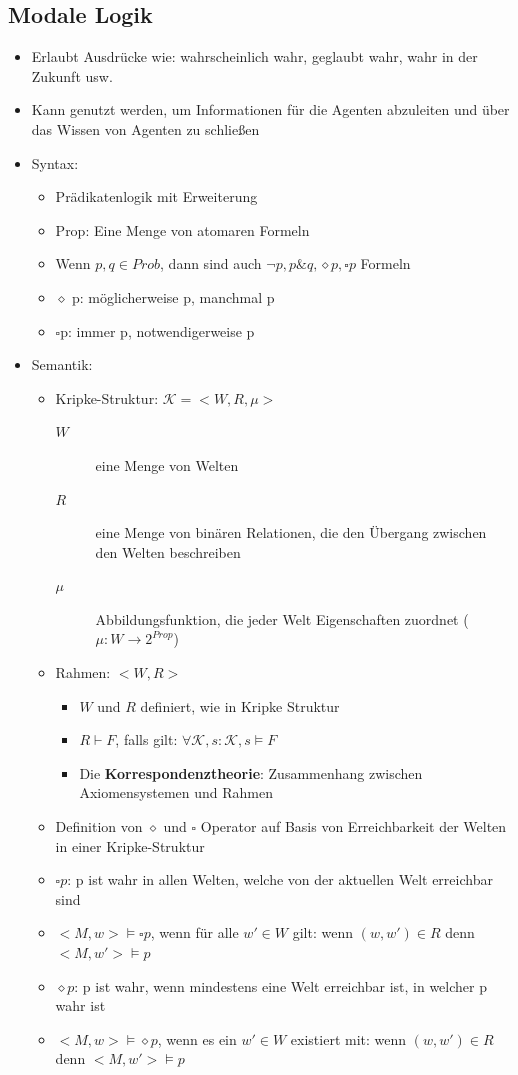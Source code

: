 \documentclass{article} %
\begin{document}
	\subsection{Modale Logik}
	\begin{itemize}
		\item Erlaubt Ausdrücke wie: wahrscheinlich wahr, geglaubt wahr, wahr in der Zukunft usw.
		\item Kann genutzt werden, um Informationen für die Agenten abzuleiten und über das Wissen von Agenten zu schließen
		\item Syntax:
		\begin{itemize}
			\item Prädikatenlogik mit Erweiterung
			\item Prop: Eine Menge von atomaren Formeln
			\item Wenn $p,q \in Prob$, dann sind auch $\neg p, p \& q, \diamond p,\square p$ Formeln
			\item $\diamond$ p: möglicherweise p, manchmal p 
			\item $\square$p: immer p, notwendigerweise p
		\end{itemize}
		\item Semantik:
		\begin{itemize}
			\item Kripke-Struktur: $\mathcal{K} = <W,R,\mu>$
			\begin{description}
				\item[$W$] eine Menge von Welten
				\item[$R$] eine Menge von binären Relationen, die den Übergang zwischen den Welten  beschreiben
				\item[$\mu$] Abbildungsfunktion, die jeder Welt Eigenschaften zuordnet ($\mu : W \rightarrow 2^{Prop}$)	
			\end{description}
				\item Rahmen: $<W,R>$
				\begin{itemize}
					\item  $W$ und $R$ definiert, wie in Kripke Struktur
					\item $R \vdash F$, falls gilt: $\forall \mathcal{K},s: \mathcal{K},s \vDash F$ 
					\item Die \textbf{Korrespondenztheorie}: Zusammenhang zwischen Axiomensystemen und Rahmen					
				\end{itemize}
			\item Definition von $\diamond$ und $\square$ Operator auf Basis von Erreichbarkeit der Welten in einer Kripke-Struktur
			\item $\square p$: p ist wahr in allen Welten, welche von der aktuellen Welt erreichbar sind
			\item $<M,w>\vDash\square p$, wenn für alle $w' \in W$ gilt: wenn $(w,w') \in R$ denn $<M,w'>\vDash p$
			\item $\diamond p$: p ist wahr, wenn mindestens eine Welt erreichbar ist, in welcher p wahr ist
			\item $<M,w>\vDash\diamond p$, wenn es ein $w' \in W$ existiert mit:  wenn $(w,w') \in R$ denn $<M,w'>\vDash p$\\
			

\end{itemize}
\end{itemize}
\end{document}
